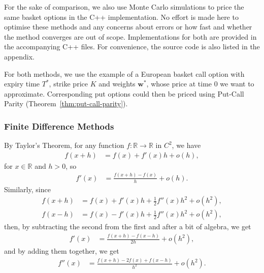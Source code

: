 \documentclass[english]{article}
\numberwithin{equation}{section}
\numberwithin{figure}{section}
\theoremstyle{bolddescit}
\theoremstyle{definition}
\theoremstyle{definition}
\theoremstyle{plain}
\theoremstyle{plain}
\theoremstyle{bolddesc}
\theoremstyle{plain}
\theoremstyle{remark}
\begin{document}
For the sake of comparison, we also use Monte Carlo simulations to price the same basket options in the C++ implementation. No effort is made here to optimise these methods and any concerns about errors or how fast and whether the method converges are out of scope. Implementations for both are provided in the accompanying C++ files. For convenience, the source code is also listed in the appendix.

For both methods, we use the example of a European basket call option with expiry time $T^*$, strike price $K$ and weights $\mathbf{w}^*$, whose price at time 0 we want to approximate. Corresponding put options could then be priced using Put-Call Parity (Theorem~\ref{thm:put-call-parity}).

\subsubsection{Finite Difference Methods}\label{sec:finite-difference}

By Taylor's Theorem, for any function $f : \mathbb{R} \to \mathbb{R}$ in $C^2$, we have
\begin{align*}
  f(x+h) &= f(x) + f'(x) h + o(h),
\end{align*}
for $x \in \mathbb{R}$ and $h > 0$, so
\begin{align*}
  f'(x) &= \frac{f(x+h) - f(x)}{h} + o(h).
\end{align*}
Similarly, since
\begin{align*}
  f(x+h) &= f(x) + f'(x) h + \frac{1}{2} f''(x) h^2 + o(h^2),\\
  f(x-h) &= f(x) - f'(x) h + \frac{1}{2} f''(x) h^2 + o(h^2),
\end{align*}
then, by subtracting the second from the first and after a bit of algebra, we get
\begin{align*}
  f'(x) &= \frac{f(x+h) - f(x-h)}{2h} + o(h^2),
\end{align*}
and by adding them together, we get
\begin{align*}
  f''(x) &= \frac{f(x+h) - 2f(x) + f(x-h)}{h^2} + o(h^2).
\end{align*}
\end{document}

